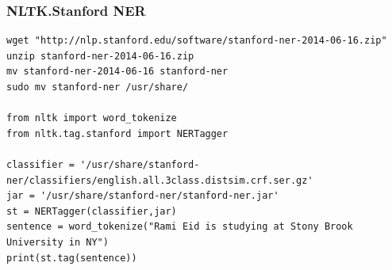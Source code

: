 
\begin{frame}[fragile]\frametitle{NLTK.Stanford NER}
  \begin{lstlisting}
wget "http://nlp.stanford.edu/software/stanford-ner-2014-06-16.zip"
unzip stanford-ner-2014-06-16.zip
mv stanford-ner-2014-06-16 stanford-ner
sudo mv stanford-ner /usr/share/

from nltk import word_tokenize
from nltk.tag.stanford import NERTagger
 
classifier = '/usr/share/stanford-ner/classifiers/english.all.3class.distsim.crf.ser.gz'
jar = '/usr/share/stanford-ner/stanford-ner.jar'
st = NERTagger(classifier,jar)
sentence = word_tokenize("Rami Eid is studying at Stony Brook University in NY")
print(st.tag(sentence))
  \end{lstlisting}
\end{frame}